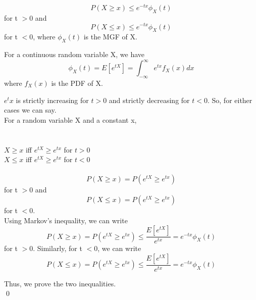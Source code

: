 \documentclass[12pt]{article}
\newenvironment{solution}{%
  \vspace{1em}
  \noindent{\Large\bfseries Solution}\par\vspace{0.5em}
  \normalfont
}{\qed\par}
\begin{document}
\begin{solution}
 \[P(X \geq x ) \leq e^{-tx}\phi _X(t)\]
 for t $> $0 and
    \[P(X \leq x) \leq e^{-tx}\phi _X(t)\]
    for t $< $0,
    where $\phi _X(t)$ is the MGF of X.

    For a continuous random variable X, we have
    \[\phi _X(t) = E[e^{tX}] = \int_{-\infty}^{\infty} e^{tx} f_X(x) dx\]
    where $f_X(x)$ is the PDF of X.

    $e^tx$ is strictly increasing for $t>0$ and strictly decreasing for $t<0$.
    So, for either cases we can say.
    \\For a random variable X and a constant x,
    \\ \\ \\ $X \geq x $ iff $ e ^ {tX} \geq e ^ {tx}$ for $t > 0$
    \\ $X \leq x $ iff $ e ^ {tX} \geq e ^ {tx}$ for $t < 0$
    \\ \\ \[P(X \geq x) = P(e^{tX} \geq e^{tx})\]
    for t $> 0$ and
    \[P(X \leq x) = P(e^{tX} \geq e^{tx})\] 
    for t $ < 0$.
    \\Using Markov's inequality, we can write
    \[P(X \geq x) = P(e^{tX} \geq e^{tx}) \leq \frac{E[e^{tX}]}{e^{tx}} = e^{-tx} \phi _X(t)\]
    for t $> 0$.
    Similarly, for t $< 0$, we can write
    \[P(X \leq x) = P(e^{tX} \geq e^{tx}) \leq \frac{E[e^{tX}]}{e^{tx}} = e^{-tx} \phi _X(t)\]

Thus, we prove the two inequalities.\\



\end{solution}
\end{document}
